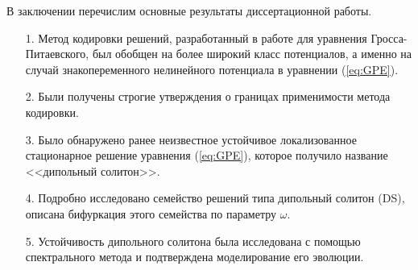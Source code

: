 \conclusion

В заключении перечислим основные результаты диссертационной работы.
%
\begin{itemize}
\item[1.] Метод кодировки решений, разработанный в работе \cite{AlfAvr} для уравнения Гросса-Питаевского, был обобщен на более широкий класс потенциалов, а именно на случай знакопеременного нелинейного потенциала в уравнении (\ref{eq:GPE}).
\item[2.] Были получены строгие утверждения о границах применимости метода кодировки.
\item[3.] Было обнаружено ранее неизвестное устойчивое локализованное стационарное решение уравнения (\ref{eq:GPE}), которое получило название <<дипольный солитон>>.
\item[4.] Подробно исследовано семейство решений типа дипольный солитон (DS), описана бифуркация этого семейства по параметру $\omega$.
\item[5.] Устойчивость дипольного солитона была исследована с помощью спектрального метода и подтверждена моделирование его эволюции.
\end{itemize}
%

